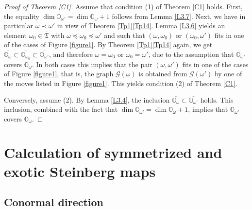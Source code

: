 \documentclass[11pt]{article}
\theoremstyle{definition}
\numberwithin{equation}{section}
\newcommand{\Xorbit}{\mathbb{O}}
\newcommand{\ppermutationsof}{\mathfrak{T}}
\newcommand{\parameters}{\overline{\ppermutationsof}}
\begin{document}
\begin{proof}[Proof of Theorem \ref{C1}]
Assume that condition (1) of Theorem \ref{C1} holds.
First, the equality
$\dim\Xorbit_{\omega'}=\dim\Xorbit_\omega+1$
follows from Lemma \ref{L3.7}.
Next, we have in particular $\omega\prec\omega'$ in view of Theorem \ref{Tp1}\ref{Tp14}. Lemma \ref{L3.6} yields an element $\omega_0\in\parameters$ with $\omega\preceq\omega_0\preceq\omega'$ and such that $(\omega,\omega_0)$ or $(\omega_0,\omega')$ fits in one of the cases of Figure \ref{figure1}. By Theorem \ref{Tp1}\ref{Tp14} again, we get $\overline{\Xorbit_\omega}\subset\overline{\Xorbit_{\omega_0}}\subset\overline{\Xorbit_{\omega'}}$, and therefore $\omega=\omega_0$ or $\omega_0=\omega'$, due to the assumption that $\Xorbit_{\omega'}$ covers $\Xorbit_\omega$. In both cases this implies that the pair $(\omega,\omega')$ fits in one of the cases of Figure \ref{figure1}, that is, the graph $\mathcal{G}(\omega)$ is obtained from $\mathcal{G}(\omega')$ by one of the moves listed in Figure \ref{figure1}. This yields condition (2) of Theorem \ref{C1}.

Conversely, assume (2). By Lemma \ref{L3.4}, the inclusion $\overline{\Xorbit_\omega}\subset\overline{\Xorbit_{\omega'}}$ holds. This inclusion, combined with the fact that $\dim\Xorbit_{\omega'}=\dim\Xorbit_\omega+1$, implies that $\Xorbit_{\omega'}$ covers $\Xorbit_\omega$.
\end{proof}

\setcounter{figure}{3}
\section{Calculation of symmetrized and exotic Steinberg maps}

\label{section-4}

\subsection{Conormal direction}
\end{document}
